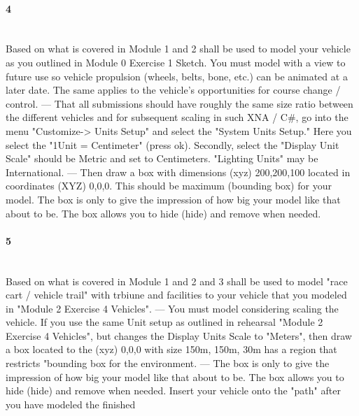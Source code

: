\paragraph{ 4} ~\\
Based on what is covered in Module 1 and 2 shall be used to model your vehicle as you outlined in Module 0 Exercise 1 Sketch. 
You must model with a view to future use so vehicle propulsion (wheels, belts, bone, etc.) can be animated at a later date. 
The same applies to the vehicle's opportunities for course change / control.
---
That all submissions should have roughly the same size ratio between the different vehicles and for subsequent scaling in such XNA / C\#, 
go into the menu "Customize-> Units Setup" and select the "System Units Setup." 
Here you select the "1Unit = Centimeter" (press ok). 
Secondly, select the "Display Unit Scale" should be Metric and set to Centimeters. 
"Lighting Units" may be International.
---
Then draw a box with dimensions (xyz) 200,200,100 located in coordinates (XYZ) 0,0,0. 
This should be maximum (bounding box) for your model. The box is only to give the impression of how big your model like that about to be. 
The box allows you to hide (hide) and remove when needed.

\paragraph{ 5} ~\\
Based on what is covered in Module 1 and 2 and 3 shall be used to model "race cart / vehicle trail" with trbiune and facilities to your vehicle that you modeled in 
"Module 2 Exercise 4 Vehicles".
---
You must model considering scaling the vehicle. 
If you use the same Unit setup as outlined in rehearsal "Module 2 Exercise 4 Vehicles", but changes the Display Units Scale to "Meters", 
then draw a box located to the (xyz) 0,0,0 with size 150m, 150m, 30m has a region that restricts "bounding box for the environment.
---
The box is only to give the impression of how big your model like that about to be. 
The box allows you to hide (hide) and remove when needed. 
Insert your vehicle onto the "path" after you have modeled the finished

